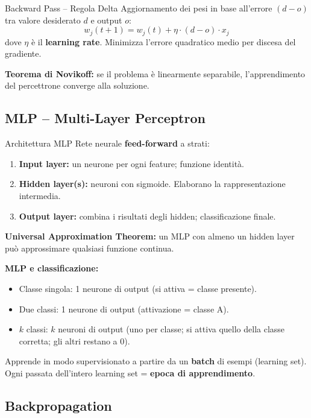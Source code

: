 \documentclass[12pt,a4paper]{article}
\begin{document}
\begin{formulabox}{Backward Pass -- Regola Delta}
Aggiornamento dei pesi in base all'errore $(d - o)$ tra valore desiderato $d$ e output $o$:
\[
w_j(t+1) = w_j(t) + \eta \cdot (d - o) \cdot x_j
\]
dove $\eta$ è il \textbf{learning rate}. Minimizza l'errore quadratico medio per discesa del gradiente.

\textbf{Teorema di Novikoff:} se il problema è linearmente separabile, l'apprendimento del percettrone converge alla soluzione.
\end{formulabox}

\subsection{MLP -- Multi-Layer Perceptron}

\begin{defbox}{Architettura MLP}
Rete neurale \textbf{feed-forward} a strati:
\begin{enumerate}[noitemsep]
  \item \textbf{Input layer:} un neurone per ogni feature; funzione identità.
  \item \textbf{Hidden layer(s):} neuroni con sigmoide. Elaborano la rappresentazione intermedia.
  \item \textbf{Output layer:} combina i risultati degli hidden; classificazione finale.
\end{enumerate}
\textbf{Universal Approximation Theorem:} un MLP con almeno un hidden layer può approssimare qualsiasi funzione continua.

\textbf{MLP e classificazione:}
\begin{itemize}[noitemsep]
  \item Classe singola: 1 neurone di output (si attiva = classe presente).
  \item Due classi: 1 neurone di output (attivazione = classe A).
  \item $k$ classi: $k$ neuroni di output (uno per classe; si attiva quello della classe corretta; gli altri restano a 0).
\end{itemize}

Apprende in modo supervisionato a partire da un \textbf{batch} di esempi (learning set). Ogni passata dell'intero learning set = \textbf{epoca di apprendimento}.
\end{defbox}

\subsection{Backpropagation}
\end{document}
